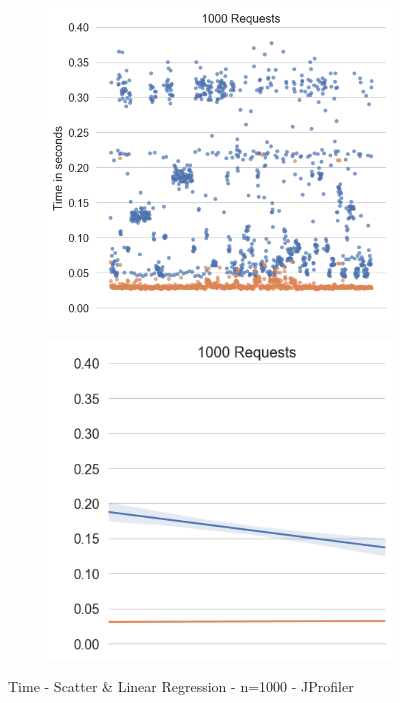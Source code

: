 \begin{figure}[H]
  \centering
  \begin{subfigure}[b]{0.45\textwidth}
    \includegraphics[width=1.0\linewidth]{img/footprint/scatter-1000.png}
  \end{subfigure}
  \begin{subfigure}[b]{0.45\textwidth}
    \includegraphics[width=1.0\linewidth]{img/footprint/linres-1000.png}
  \end{subfigure}
  \caption{Time - Scatter \& Linear Regression - n=1000 - JProfiler}
\end{figure}

